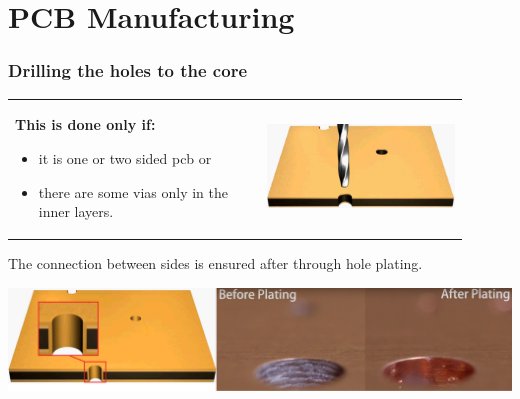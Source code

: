 \documentclass{beamer}
\begin{document}
\section{\texorpdfstring{PCB Manufacturing}{PCB Manufacturing}}
	\begin{frame}
    \frametitle{Drilling the holes to the core}

		\begin{center}
			\begin{tabular}{m{0.5\linewidth} m{0.4\linewidth}}
			\textbf{This is done only if:}
			\begin{itemize}
				\item it is one or two sided pcb or
				\item there are some vias only in the inner layers.
			\end{itemize}
			 & \includegraphics[scale=0.12]{obr03_jadroVrtani.png}
			\end{tabular}
		\end{center}
		The connection between sides is ensured after through hole plating.
		\begin{center}
		\includegraphics[scale=0.14]{obr04_jadroProkovy.png}
		\end{center}
	\end{frame}
\end{document}
